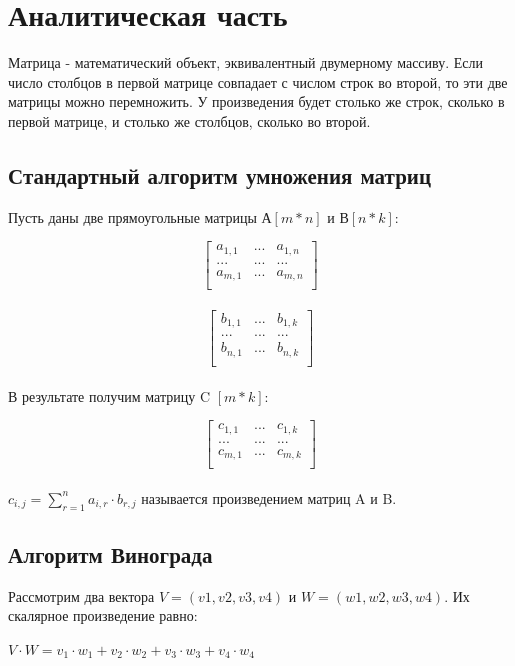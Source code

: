 \documentclass[12pt]{report}
\begin{document}
\chapter{Аналитическая часть}
Матрица - математический объект, эквивалентный двумерному массиву. Если число столбцов в первой матрице совпадает с числом строк во второй, то эти две матрицы можно перемножить. У произведения будет столько же строк, сколько в первой матрице, и столько же столбцов, сколько во второй.
	    
\section{Стандартный алгоритм умножения матриц}
Пусть даны две прямоугольные матрицы А$[m * n]$ и В$[n * k]$:  

\[ \begin{bmatrix}
a_{1,1} & ... & a_{1,n} \\
... & ... & ... \\
a_{m,1} & ... & a_{m,n} \\
\end{bmatrix} \]\\

\[ \begin{bmatrix}
b_{1,1} & ... & b_{1,k} \\
... & ... & ... \\
b_{n,1} & ... & b_{n,k} \\
\end{bmatrix} \]\\

В результате получим матрицу C $[m *  k]$:
	
\[ \begin{bmatrix}
c_{1,1} & ... & c_{1,k} \\
... & ... & ... \\
c_{m,1} & ... & c_{m,k} \\
\end{bmatrix} \]\\


$c_{i,j} = \sum\limits_{r=1}^n a_{i,r}\cdot b_{r,j}$ называется произведением матриц A и B.


\section{Алгоритм Винограда}
Рассмотрим два вектора $V = (v1, v2, v3, v4)$ и $W = (w1, w2, w3, w4)$. Их скалярное произведение равно: 

$ V \cdot W=v_1 \cdot w_1 + v_2 \cdot w_2 + v_3 \cdot w_3 + v_4 \cdot w_4$ \\
\end{document}
